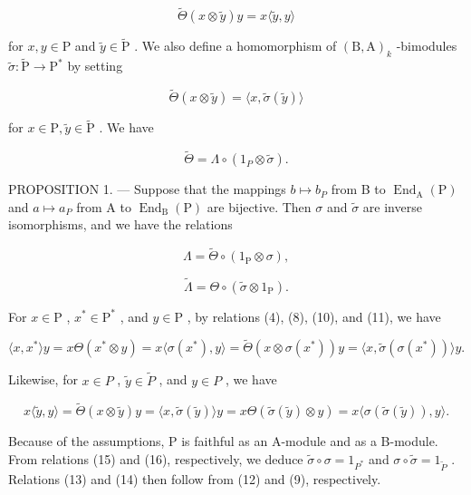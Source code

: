 \[
\widetilde {\Theta} (x \otimes \widetilde {y}) y = x \langle \widetilde {y}, y \rangle\tag{10}
\]

for \(x, y \in \mathrm{P}\) and \(\widetilde{y} \in \widetilde{\mathrm{P}}\) . We also define a homomorphism of \((\mathrm{B}, \mathrm{A})_k\) -bimodules \(\widetilde{\sigma}: \widetilde{\mathrm{P}} \to \mathrm{P}^*\) by setting

\[
\widetilde {\Theta} (x \otimes \widetilde {y}) = \langle x, \widetilde {\sigma} (\widetilde {y}) \rangle\tag{11}
\]

for \(x\in \mathrm{P},\widetilde{y}\in \widetilde{\mathrm{P}}\) . We have

\[
\widetilde {\Theta} = \Lambda \circ (1 _ {P} \otimes \widetilde {\sigma}).\tag{12}
\]

PROPOSITION 1. --- Suppose that the mappings \(b \mapsto b_{P}\) from B to \(\operatorname{End}_{\mathrm{A}}(\mathrm{P})\) and \(a \mapsto a_{P}\) from A to \(\operatorname{End}_{\mathrm{B}}(\mathrm{P})\) are bijective. Then \(\sigma\) and \(\widetilde{\sigma}\) are inverse isomorphisms, and we have the relations

\[
\Lambda = \widetilde {\Theta} \circ (1 _ {\mathrm{P}} \otimes \sigma),\tag{13}
\]

\[
\widetilde {\Lambda} = \Theta \circ (\widetilde {\sigma} \otimes 1 _ {\mathrm{P}}).\tag{14}
\]

For \(x \in \mathrm{P}\) , \(x^{*} \in \mathrm{P}^{*}\) , and \(y \in \mathrm{P}\) , by relations (4), (8), (10), and (11), we have

\[
\langle x, x ^ {*} \rangle y = x \Theta (x ^ {*} \otimes y) = x \langle \sigma (x ^ {*}), y \rangle = \widetilde {\Theta} (x \otimes \sigma (x ^ {*})) y = \langle x, \widetilde {\sigma} (\sigma (x ^ {*})) \rangle y.\tag{15}
\]

Likewise, for \(x \in P\) , \(\widetilde{y} \in \widetilde{P}\) , and \(y \in P\) , we have

\[
x \langle \widetilde {y}, y \rangle = \widetilde {\Theta} (x \otimes \widetilde {y}) y = \langle x, \widetilde {\sigma} (\widetilde {y}) \rangle y = x \Theta (\widetilde {\sigma} (\widetilde {y}) \otimes y) = x \langle \sigma (\widetilde {\sigma} (\widetilde {y})), y \rangle .\tag{16}
\]

Because of the assumptions, P is faithful as an A-module and as a B-module. From relations (15) and (16), respectively, we deduce \(\widetilde{\sigma} \circ \sigma = 1_{P^{*}}\) and \(\sigma \circ \widetilde{\sigma} = 1_{\widetilde{P}}\) . Relations (13) and (14) then follow from (12) and (9), respectively.

